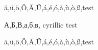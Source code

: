 \documentclass{article}
\begin{document}
ä,ü,ö,Ö,Ä,Ü,á,é,ó,à,ù,ò,ß,test

\ifx\Umathchar\undefined{}\selectfont\fi
А,Б,В,а,б,в, cyrillic test

{\selectfont
ä,ü,ö,Ö,Ä,Ü,á,é,ó,à,ù,ò,ß,test}
\end{document}
